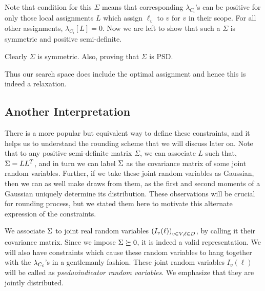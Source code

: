 Note that \cite{lambda and sigma} condition for this $\Sigma$ means that corresponding $\lambda_{C_i}$'s can be positive for only those local assignments $L$ which assign $\ell_v$ to $v$ for $v$ in their scope. 
For all other assignments, $\lambda_{C_i}[L]=0$.
Now we are left to show that such a $\Sigma$ is symmetric and positive semi-definite.

Clearly $\Sigma$ is symmetric. 
Also, 
proving that $\Sigma$ is PSD. 

 Thus our search space does include the optimal assignment and hence this is indeed a relaxation.

\subsection{Another Interpretation}

There is a more popular but equivalent way to define these constraints, and it helps us to understand the rounding scheme that we will discuss later on. 
Note that to any positive semi-definite matrix $\Sigma$, we can associate $L$ such that, $\Sigma = LL^T$, and in turn we can label $\Sigma$ as the covariance matrix of some joint random variables. 
Further, if we take these joint random variables as Gaussian, then we can as well make draws from them, as the first and second moments of a Gaussian  uniquely determine its distribution. 
These observations will be crucial for rounding process, but we stated them here to motivate this alternate expression of the constraints. 

We associate $\Sigma$ to joint real random variables $\left(I_v(\ell)\right)_{v\in V, \ell \in D}$, by calling it their covariance matrix. Since we impose $\Sigma \succeq 0$, it is indeed a valid representation. 
We will also have constraints which cause these random variables to hang together with the $\lambda_{C_i}$'s in a gentlemanly fashion. 
These joint random variables $I_v(\ell)$ will be called as \textit{pseduoindicator random variables}. 
We emphasize that they are jointly distributed. 


